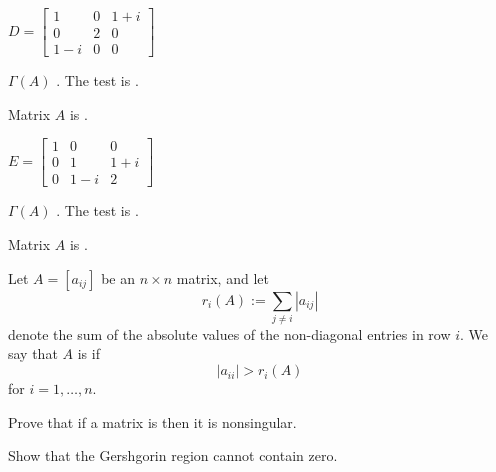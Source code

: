 \documentclass{ximera}
\begin{document}
\begin{problem}\label{prob:Gersh4}
$D = \left[ \begin{array}{ccc}
1 & 0 &  1 + i\\
0 & 2 & 0 \\
1 - i & 0 & 0
\end{array}\right]$

\begin{prompt}
$\Gamma (A)$ .  The test is .
\end{prompt}
\begin{problem}
Matrix $A$ is .
\end{problem}
\end{problem}

\begin{problem}\label{prob:Gersh5}
$E = \left[ \begin{array}{ccc}
1 & 0 & 0\\
0 & 1 & 1 + i\\
0 & 1 - i & 2
\end{array}\right]$

\begin{prompt}
$\Gamma (A)$ .  The test is .
\end{prompt}
\begin{problem}
Matrix $A$ is .
\end{problem}
\end{problem}


\begin{problem}\label{prob:prove_diag_dom_nonsingular}
Let $A=[a_{ij}]$ be an $n\times n$ matrix, and let
$$
r_i(A):= \sum_{j \ne i} |a_{ij}|
$$
denote the sum of the absolute values of the non-diagonal entries in row $i$.  We say that $A$ is  if 
$$|a_{ii}|>r_i(A)$$
for $i=1,\dots , n$.

Prove that if a matrix is  
    then it is nonsingular.

    \begin{hint}
    Show that the Gershgorin region cannot contain zero.
    \end{hint}
\end{problem}
\end{document}
